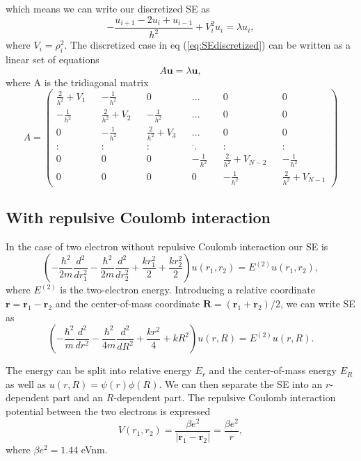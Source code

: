 \documentclass[norsk,a4paper,12pt]{article}
\begin{document}
which means we can write our discretized SE as 
\begin{equation}
-\frac{u_{i+1}-2u_i + u_{i-1}}{h^2} + V_i^2u_i = \lambda u_i,
\label{eq:SEdiscretized}
\end{equation}
where $V_i=\rho_i^2$.
The discretized case in eq (\ref{eq:SEdiscretized}) can be written as a linear set of equations 
\begin{equation}
A\textbf{u} = \lambda \textbf{u},
\label{eq:Aulambdau}
\end{equation}
where A is the tridiagonal matrix
\setcounter{MaxMatrixCols}{20}
\begin{equation}
A=\begin{pmatrix}
\frac{2}{h^2} + V_1 && -\frac{1}{h^2} && 0 && ... && 0 && 0 \\
-\frac{1}{h^2} && \frac{2}{h^2} + V_2 && -\frac{1}{h^2} && ... && 0 && 0 \\
0 && -\frac{1}{h^2} && \frac{2}{h^2} + V_3 && ... && 0 && 0 \\
: && : && : && ^{\textbf{.}}. && : && : \\
0 && 0 && 0 && -\frac{1}{h^2} && \frac{2}{h^2} + V_{N-2} && -\frac{1}{h^2} \\
0 && 0 && 0 && 0 && -\frac{1}{h^2} && \frac{2}{h^2} + V_{N-1}
\end{pmatrix}
\label{eq:A}
\end{equation}
\subsection{With repulsive Coulomb interaction}
In the case of two electron without repulsive Coulomb interaction our SE is 
$$\left(-\frac{\hbar ^2}{2m}\frac{d^2}{dr_1^2} - \frac{\hbar ^2}{2m}\frac{d^2}{dr_2^2} + \frac{kr_1^2}{2} + \frac{kr_2^2}{2}\right)u(r_1,r_2) = E^{(2)}u(r_1,r_2),$$
where $E^{(2)}$ is the two-electron energy. Introducing a relative coordinate $\textbf{r} = \textbf{r}_1-\textbf{r}_2$ and the center-of-mass coordinate $\textbf{R} = (\textbf{r}_1 + \textbf{r}_2)/2$, we can write SE as
$$\left(-\frac{\hbar ^2}{m}\frac{d^2}{dr^2} - \frac{\hbar ^2}{4m}\frac{d^2}{dR^2} + \frac{kr^2}{4} + kR^2\right)u(r,R) = E^{(2)}u(r,R).$$


The energy can be split into relative energy $E_r$ and the center-of-mass energy $E_R$ as well as $u(r,R) = \psi(r) \phi(R)$. We can then separate the SE into an $r$-dependent part and an $R$-dependent part. The repulsive Coulomb interaction potential between the two electrons is expressed $$V(r_1,r_2) = \frac{\beta e^2}{|\textbf{r}_1-\textbf{r}_2|} = \frac{\beta e^2}{r},$$ where $\beta e^2 = 1.44$ eVnm. 
\end{document}
